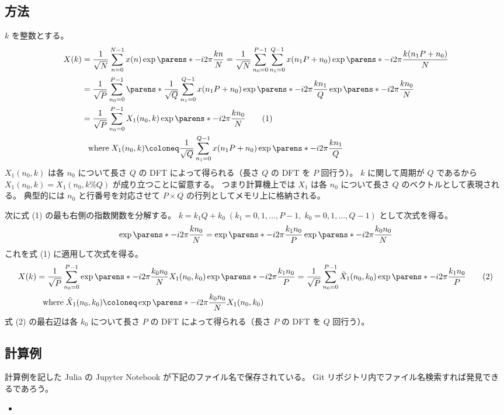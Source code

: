         \subsection{方法}
            $k$ を整数とする。
            \begin{align*}
                X(k) &= \frac{1}{\sqrt{N}}\sum_{n=0}^{N-1}x(n)\exp\parens*{-i2\pi\frac{k n}{N}} = \frac{1}{\sqrt{N}}\sum_{n_0=0}^{P-1}\sum_{n_1=0}^{Q-1}x(n_1 P+n_0)\exp\parens*{-i2\pi\frac{k(n_1 P+n_0)}{N}} \\
                &= \frac{1}{\sqrt{P}}\sum_{n_0=0}^{P-1}\parens*{\frac{1}{\sqrt{Q}}\sum_{n_1=0}^{Q-1}x(n_1 P+n_0)\exp\parens*{-i2\pi\frac{k n_1}{Q}}}\exp\parens*{-i2\pi\frac{k n_0}{N}} \\
                &= \frac{1}{\sqrt{P}}\sum_{n_0=0}^{P-1}X_1(n_0,k)\exp\parens*{-i2\pi\frac{k n_0}{N}} \tag{1} \\
                &\phantom{=}\text{where}\;X_1(n_0,k)\coloneq\frac{1}{\sqrt{Q}}\sum_{n_1=0}^{Q-1}x(n_1 P+n_0)\exp\parens*{-i2\pi\frac{k n_1}{Q}}
            \end{align*}
            $X_1(n_0,k)$ は各 $n_0$ について長さ $Q$ の DFT によって得られる（長さ $Q$ の DFT を $P$ 回行う）。
            $k$ に関して周期が $Q$ であるから $X_1(n_0,k) = X_1(n_0,k\%Q)$ が成り立つことに留意する。
            つまり計算機上では $X_1$ は各 $n_0$ について長さ $Q$ のベクトルとして表現される。
            典型的には $n_0$ と行番号を対応させて $P\times Q$ の行列としてメモリ上に格納される。
            \par
            次に式 (1) の最も右側の指数関数を分解する。
            $k = k_1 Q + k_0\;(k_1=0,1,\dots,P-1,\;k_0=0,1,\dots,Q-1)$ として次式を得る。
            \[ \exp\parens*{-i2\pi\frac{k n_0}{N}} = \exp\parens*{-i2\pi\frac{k_1 n_0}{P}}\exp\parens*{-i2\pi\frac{k_0 n_0}{N}} \]
            これを式 (1) に適用して次式を得る。
            \begin{align*}
                X(k) &= \frac{1}{\sqrt{P}}\sum_{n_0=0}^{P-1}\exp\parens*{-i2\pi\frac{k_0 n_0}{N}}X_1(n_0,k_0)\exp\parens*{-i2\pi\frac{k_1 n_0}{P}} = \frac{1}{\sqrt{P}}\sum_{n_0=0}^{P-1}\tilde{X}_1(n_0,k_0)\exp\parens*{-i2\pi\frac{k_1 n_0}{P}} \tag{2} \\
                &\phantom{=}\text{where}\;\tilde{X}_1(n_0,k_0)\coloneq\exp\parens*{-i2\pi\frac{k_0 n_0}{N}}X_1(n_0,k_0)
            \end{align*}
            式 (2) の最右辺は各 $k_0$ について長さ $P$ の DFT によって得られる（長さ $P$ の DFT を $Q$ 回行う）。
        \subsection{計算例}
            計算例を記した Julia の Jupyter Notebook が下記のファイル名で保存されている。
            Git リポジトリ内でファイル名検索すれば発見できるであろう。
            \begin{itemize}
                \item \href{\currfiledir/DFT_len_fact_expr.ipynb}{}
            \end{itemize}